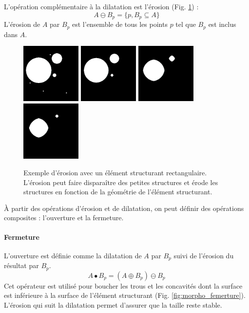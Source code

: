 L'opération complémentaire à la dilatation est l'érosion (Fig. \ref{fig:morpho_erosion}) :
\begin{equation}
  A \ominus B_p = \{p, B_p \subseteq A\}
\end{equation}
L'érosion de $A$ par $B_p$ est l'ensemble de tous les points $p$ tel que $B_p$ est inclus dans $A$. 

\begin{figure}[h]
  \centering
  \includegraphics[height=3cm]{Images/morpho_init.png}
  \includegraphics[height=3cm]{Images/morpho_erode_k5.png}
  \includegraphics[height=3cm]{Images/morpho_erode_k21.png}
  \includegraphics[height=3cm]{Images/morpho_erode_k31.png}
  \caption{Exemple d'érosion avec un élément structurant rectangulaire. L'érosion peut faire disparaître des petites structures et érode les structures en fonction de la géométrie de l'élément structurant.}
  \label{fig:morpho_erosion}
\end{figure}

À partir des opérations d'érosion et de dilatation, on peut définir des opérations composites : l'ouverture et la fermeture.
\paragraph{Fermeture}
L'ouverture est définie comme la dilatation de $A$ par $B_p$ suivi de l'érosion du résultat par $B_p$.
\begin{equation}
 A \bullet B_p = (A \oplus B_p) \ominus B_p
\end{equation}  
Cet opérateur est utilisé pour boucher les trous et les concavités dont la surface est inférieure à la surface de l'élément structurant (Fig. \ref{fig:morpho_femerture}). L'érosion qui suit la dilatation permet d'assurer que la taille reste stable.

